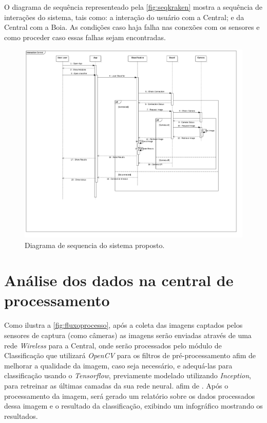 O diagrama de sequência representeado pela \autoref{fig:seqkraken} mostra a sequência de interações do sistema, tais como: a interação do usuário com a Central; e da Central com a Boia. As condições caso haja falha nas conexões com os sensores e como proceder caso essas falhas sejam encontradas.

\begin{figure}[ht]
	\caption{\label{fig:seqkraken}  Diagrama de sequencia do sistema proposto.}
	 \begin{center}
		\includegraphics[width = 1\textwidth]			{resources/sequencekraken}
    \end{center}
\end{figure}



\section{Análise dos dados na central de processamento}

Como ilustra a \autoref{fig:fluxoprocesso}, após a coleta das imagens captados pelos sensores de captura (como câmeras) as imagens serão enviadas através de uma rede \textit{Wireless} para a Central, onde serão processados pelo módulo de Classificação que utilizará \textit{OpenCV} para os filtros de pré-processamento afim de melhorar a qualidade da imagem, caso seja necessário, e adequá-las para classificação usando o \textit{Tensorflow}, previamente modelado utilizando \textit{Inception}, para retreinar as últimas camadas da sua rede neural. afim de . 
Após o processamento da imagem, será gerado um relatório sobre os dados processados dessa imagem e o resultado da classificação, exibindo um infográfico mostrando os resultados.


